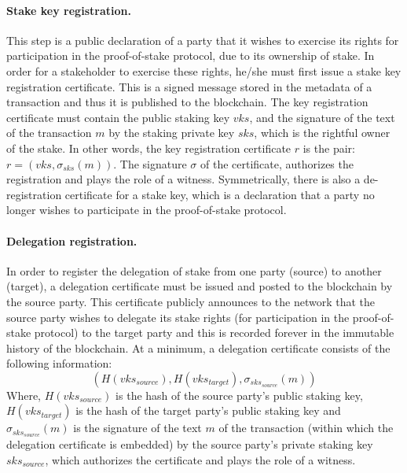\paragraph{Stake key registration.}
This step is a public declaration of a party that it wishes to exercise its rights for participation in the proof-of-stake protocol, due to its ownership of stake. In order for a stakeholder to exercise these rights, he/she must first issue a stake key registration certificate. This is a signed message stored in the metadata of a transaction and thus it is published to the blockchain. The key registration certificate must contain the public staking key $vks$, and the signature of the text of the transaction $m$ by the staking private key $sks$, which is the rightful owner of the stake. In other words, the key registration certificate $r$ is the pair: $r = (vks, \sigma_{sks}(m))$. The signature $\sigma$ of the certificate, authorizes the registration and  plays the role of a witness. 
Symmetrically, there is also a de-registration certificate for a stake key, which is a declaration that a party no longer wishes to participate in the proof-of-stake protocol.

\paragraph{Delegation registration.} 
In order to register the delegation of stake from one party (source) to another (target), a delegation certificate must be issued and posted to the blockchain by the source party. This certificate publicly announces to the network that the source party wishes to delegate its stake rights (for participation in the proof-of-stake protocol) to the target party and this is recorded forever in the immutable history of the blockchain. 
At a minimum, a delegation certificate consists of the following information:
$$
(H(vks_{source}), H(vks_{target}), \sigma_{sks_{source}}(m))
$$ 
Where, $H(vks_{source})$ is the hash of the source party's public staking key, $H(vks_{target})$ is the hash of the target party's public staking key and $\sigma_{sks_{source}}(m)$ is the signature of the text $m$ of the transaction (within which the delegation certificate is embedded) by the source party's private staking key $sks_{source}$, which authorizes the certificate and plays the role of a witness.

